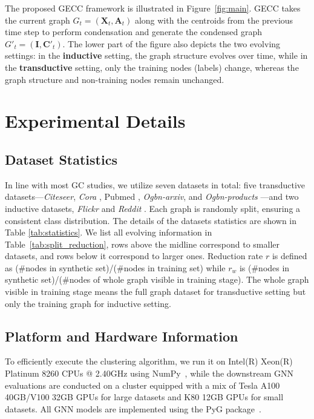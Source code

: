 The proposed GECC framework is illustrated in Figure~\ref{fig:main}. GECC takes the current graph \( G_t = (\mathbf{X}_t, \mathbf{A}_t) \) along with the centroids from the previous time step to perform condensation and generate the condensed graph \( G'_t = (\mathbf{I}, \mathbf{C}'_t) \). The lower part of the figure also depicts the two evolving settings: in the \textbf{inductive} setting, the graph structure evolves over time, while in the \textbf{transductive} setting, only the training nodes (labels) change, whereas the graph structure and non-training nodes remain unchanged.



\section{Experimental Details}\label{app:exp}

\subsection{Dataset Statistics}
\label{app:statistics}
In line with most GC studies, we utilize seven datasets in total: five transductive datasets—\textit{Citeseer}, \textit{Cora} \citep{kipf2016semi}, Pubmed \citep{namata2012query}, \textit{Ogbn-arxiv}, and \textit{Ogbn-products} \citep{hu2020open}—and two inductive datasets, \textit{Flickr} and \textit{Reddit} \citep{zeng2019graphsaint}. Each graph is randomly split, ensuring a consistent class distribution. The details of the datasets statistics are shown in Table \ref{tab:statistics}. We list all evolving information in Table~\ref{tab:split_reduction}, rows above the midline correspond to smaller datasets, and rows below it correspond to larger ones.
Reduction rate $r$ is defined as (\#nodes in synthetic set)/(\#nodes in training set) while $r_w$ is (\#nodes in synthetic set)/(\#nodes of whole graph visible in training stage). The whole graph visible in training stage means the full graph dataset for transductive setting but only the training graph for inductive setting.


\subsection{Platform and Hardware Information}
To efficiently execute the clustering algorithm, we run it on Intel(R) Xeon(R) Platinum 8260 CPUs @ 2.40GHz using NumPy~\cite{numpy}, while the downstream GNN evaluations are conducted on a cluster equipped with a mix of Tesla A100 40GB/V100 32GB GPUs for large datasets and K80 12GB GPUs for small datasets. All GNN models are implemented using the PyG package~\cite{pyg}.

